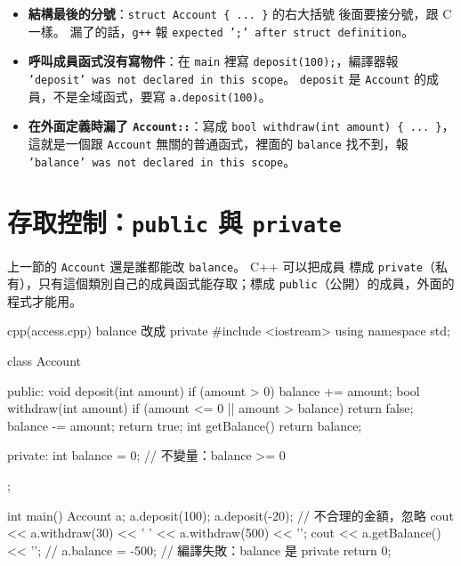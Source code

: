 \begin{itemize}
\item \textbf{結構最後的分號}：\texttt{struct Account \{ ... \}} 的右大括號
後面要接分號，跟 C 一樣。 漏了的話，\texttt{g++} 報 \texttt{expected ';'
after struct definition}。
\item \textbf{呼叫成員函式沒有寫物件}：在 \texttt{main} 裡寫
\texttt{deposit(100);}，編譯器報 \texttt{'deposit' was not declared in this
scope}。 \texttt{deposit} 是 \texttt{Account} 的成員，不是全域函式，要寫
\texttt{a.deposit(100)}。
\item \textbf{在外面定義時漏了 \texttt{Account::}}：寫成
\texttt{bool withdraw(int amount) \{ ... \}}，這就是一個跟
\texttt{Account} 無關的普通函式，裡面的 \texttt{balance} 找不到，報
\texttt{'balance' was not declared in this scope}。
\end{itemize}

\section{存取控制：\texttt{public} 與 \texttt{private}}
\label{sec:access}

上一節的 \texttt{Account} 還是誰都能改 \texttt{balance}。 C++ 可以把成員
標成 \texttt{private}（私有），只有這個類別自己的成員函式能存取；標成
\texttt{public}（公開）的成員，外面的程式才能用。

\begin{example}[label=ex:access]{cpp}{(access.cpp) balance 改成 private}
#include <iostream>
using namespace std;

class Account {
public:
    void deposit(int amount) {
        if (amount > 0) {
            balance += amount;
        }
    }
    bool withdraw(int amount) {
        if (amount <= 0 || amount > balance) {
            return false;
        }
        balance -= amount;
        return true;
    }
    int getBalance() {
        return balance;
    }

private:
    int balance = 0;    // 不變量：balance >= 0
};

int main() {
    Account a;
    a.deposit(100);
    a.deposit(-20);                  // 不合理的金額，忽略
    cout << a.withdraw(30) << ' ' << a.withdraw(500) << '\n';
    cout << a.getBalance() << '\n';
    // a.balance = -500;             // 編譯失敗：balance 是 private
    return 0;
}
\end{example}



